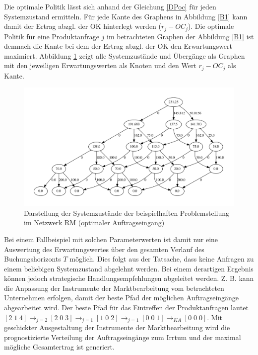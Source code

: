 Die optimale Politik lässt sich anhand der Gleichung \eqref{DPoc} für jeden Systemzustand ermitteln. Für jede Kante des Graphens in Abbildung \ref{B1} kann damit der Ertrag abzgl. der OK hinterlegt werden ($r_{j}-OC_{j}$). Die optimale Politik für eine Produktanfrage $j$ im betrachteten Graphen der Abbildung \ref{B1} ist demnach die Kante bei dem der Ertrag abzgl. der OK den Erwartungswert maximiert. Abbildung \ref{B1a} zeigt alle Systemzustände und Übergänge als Graphen mit den jeweiligen Erwartungswerten als Knoten und den Wert $r_{j}-OC_{j}$ als Kante.
\begin{figure}[h!]
  \begin{center}
    \includegraphics[width=150mm]{Bilder/Beispiel1a.pdf}
    \caption{Darstellung der Systemzustände der beispielhaften Problemstellung im Netzwerk RM (optimaler Auftragseingang)}  \label{B1a}
  \end{center}
\end{figure}

Bei einem Fallbeispiel mit solchen Parameterwerten ist damit nur eine Auswertung des Erwartungswertes über den gesamten Verlauf des Buchungshorizonts $T$ möglich. Dies folgt aus der Tatsache, dass keine Anfragen zu einem beliebigen Systemzustand abgelehnt werden. Bei einem derartigen Ergebnis können jedoch strategische Handlungsempfehlungen abgeleitet werden. Z. B. kann die Anpassung der Instrumente der Marktbearbeitung vom betrachteten Unternehmen erfolgen, damit der beste Pfad der möglichen Auftragseingänge abgearbeitet wird. Der beste Pfad für das Eintreffen der Produktanfragen lautet $[2\;1\;4] \rightarrow_{j={2}}[2\;0\;3] \rightarrow_{j={1}}[1\;0\;2]\rightarrow_{j={1}}[0\;0\;1]\rightarrow_{KA}[0\;0\;0]$. Mit geschickter Ausgestaltung der Instrumente der Marktbearbeitung wird die prognostizierte Verteilung der Auftragseingänge zum Irrtum und der maximal mögliche Gesamtertrag ist generiert.

